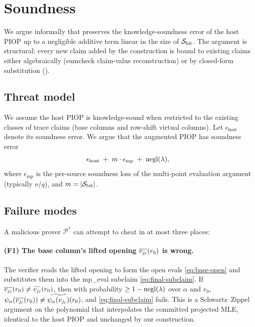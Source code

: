 \section{Soundness}
\label{sec:soundness}

We argue informally that  preserves the
knowledge-soundness error of the host PIOP up to a negligible additive
term linear in the size of $\mathcal{S}_{\mathrm{bit}}$. The argument is structural: every
new claim added by the construction is bound to existing claims either
algebraically (sumcheck claim-value reconstruction) or by closed-form
substitution ().

\subsection{Threat model}

We assume the host PIOP is knowledge-sound when restricted to the
existing classes of trace claims (base columns and row-shift virtual
columns). Let $\epsilon_{\mathrm{host}}$ denote its soundness error.
We argue that the augmented PIOP has soundness error
\[
  \epsilon_{\mathrm{host}} \;+\; m \cdot \epsilon_{\mathrm{mp}} \;+\; \operatorname{negl}(\lambda),
\]
where $\epsilon_{\mathrm{mp}}$ is the per-source soundness loss of the
multi-point evaluation argument (typically $\nu / q$), and
$m = |\mathcal{S}_{\mathrm{bit}}|$.

\subsection{Failure modes}

A malicious prover $\mathcal{P}^*$ can attempt to cheat in at most
three places:

\paragraph{(F1) The base column's lifted opening
$\overline{v_{j_\ell}}(r_0)$ is wrong.} The verifier reads the lifted
opening to form the open evals \cref{eq:base-open} and substitutes
them into the mp\_eval subclaim \cref{eq:final-subclaim}. If
$\overline{v_{j_\ell}}(r_0) \ne \widetilde{v_{j_\ell}}(r_0)$, then with
probability $\ge 1 - \operatorname{negl}(\lambda)$ over $\alpha$ and $r_0$,
$\psi_{\alpha}(\overline{v_{j_\ell}}(r_0)) \ne \widetilde{\psi_{\alpha}(v_{j_\ell})}(r_0)$, and
\cref{eq:final-subclaim} fails. This is a Schwartz–Zippel argument on
the polynomial that interpolates the committed projected MLE,
identical to the host PIOP and unchanged by our construction.

